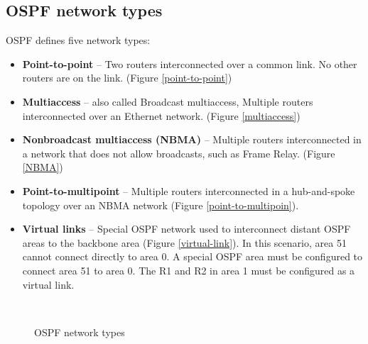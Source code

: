 \subsection{OSPF network types}
OSPF defines five network types:
\begin{itemize}
	\item \textbf{Point-to-point} -- Two routers interconnected over a common link. No other routers are on the link. (Figure \ref{point-to-point})
	\item \textbf{Multiaccess} -- also called Broadcast multiaccess, Multiple routers interconnected over an Ethernet network. (Figure \ref{multiaccess})
	\item \textbf{Nonbroadcast multiaccess (NBMA)} -- Multiple routers interconnected in a network that does not allow broadcasts, such as Frame Relay. (Figure \ref{NBMA})
	\item \textbf{Point-to-multipoint} -- Multiple routers interconnected in a hub-and-spoke topology over an NBMA network (Figure \ref{point-to-multipoin}).
	\item \textbf{Virtual links} -- Special OSPF network used to interconnect distant OSPF areas to the backbone area (Figure \ref{virtual-link}). In this scenario, area 51 cannot connect directly to area 0. A special OSPF area must be configured to connect area 51 to area 0. The R1 and R2 in area 1 must be configured as a virtual link.
	\end{itemize}
\begin{figure}%
	\centering
	\qquad%
	\\%
	\qquad%
	\caption{OSPF network types}
	\label{network-types}
	\end{figure}
